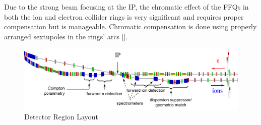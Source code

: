 Due to the strong beam focusing at the IP, the chromatic effect of the FFQs in both the ion and electron collider rings is very significant and requires proper compensation but is manageable. Chromatic compensation is done using properly arranged sextupoles in the rings’ arcs [].

\begin{figure}
	\centering
	\includegraphics[width=.75\textwidth]{../../img/detector_region_layout}
	\caption{Detector Region Layout}
	\label{fig:detector_region_layout}
\end{figure}